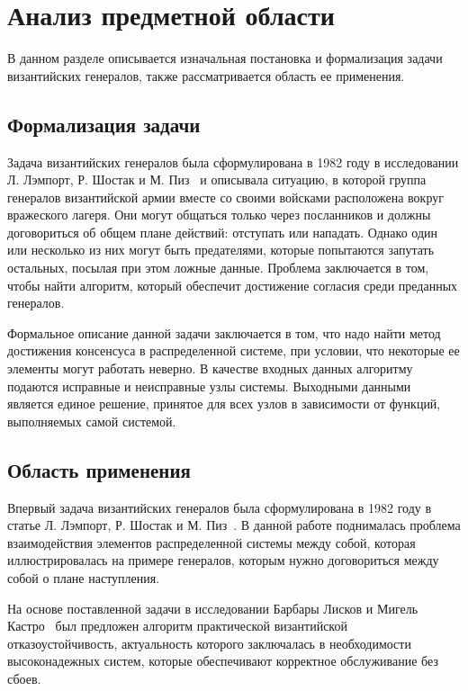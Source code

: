 
\chapter{Анализ предметной области}

В данном разделе описывается изначальная постановка и формализация задачи византийских генералов, также рассматривается область ее применения.

\section{Формализация задачи}

Задача византийских генералов была сформулирована в 1982 году в исследовании Л. Лэмпорт, Р. Шостак и М. Пиз~\cite{LamportBGP} и описывала ситуацию, в которой группа генералов византийской армии вместе со своими войсками расположена вокруг вражеского лагеря. Они могут общаться только через посланников и должны договориться об общем плане действий: отступать или нападать. Однако один или несколько из них могут быть предателями, которые попытаются запутать остальных, посылая при этом ложные данные. Проблема заключается в том, чтобы найти алгоритм, который обеспечит достижение согласия среди преданных генералов. 

Формальное описание данной задачи заключается в том, что надо найти метод достижения консенсуса в распределенной системе, при условии, что некоторые ее элементы могут работать неверно. В качестве входных данных алгоритму подаются исправные и неисправные узлы системы. Выходными данными является единое решение, принятое для всех узлов в зависимости от функций, выполняемых самой системой.

\FloatBarrier
{}
\FloatBarrier

\section{Область применения}

Впервый задача византийских генералов была сформулирована в 1982 году в статье Л. Лэмпорт, Р. Шостак и М. Пиз~\cite{LamportBGP}. В данной работе поднималась проблема взаимодействия элементов распределенной системы между собой, которая иллюстрировалась на примере генералов, которым нужно договориться между собой о плане наступления.

На основе поставленной задачи в исследовании Барбары Лисков и Мигель Кастро~\cite{Castro2002} был предложен алгоритм практической византийской отказоустойчивость, актуальность которого заключалась в необходимости высоконадежных систем, которые обеспечивают корректное обслуживание без сбоев. 


